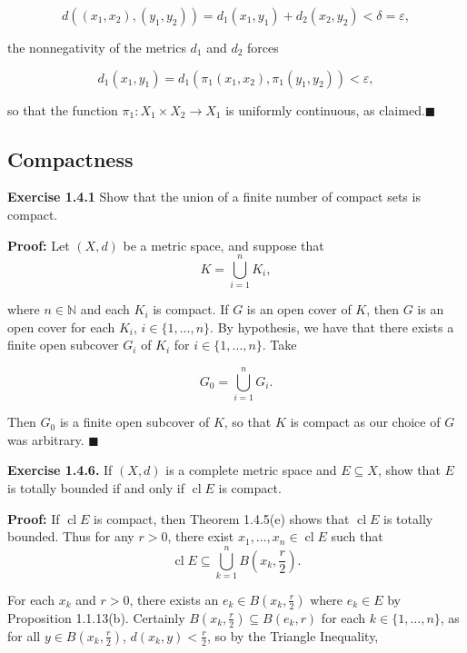 \documentclass{article}
\DeclareMathOperator{\cl}{cl}
\begin{document}
\begin{equation*}
    d((x_1,x_2),(y_1,y_2))=d_1(x_1,y_1)+d_2(x_2,y_2)<\delta =\varepsilon,
\end{equation*}

the nonnegativity of the metrics $d_1$ and $d_2$ forces

\begin{equation*}
    d_1(x_1,y_1)=d_1\left(\pi_1(x_1,x_2),\pi_1(y_1,y_2)\right)<\varepsilon,
\end{equation*}

so that the function $\pi_1 :X_1 \times X_2\to X_1$ is uniformly continuous, as claimed.$\blacksquare$
\newpage
\subsection{ Compactness}
\begin{tcolorbox}
\textbf{Exercise 1.4.1} Show that the union of a finite number of compact sets is compact.
\end{tcolorbox}
\textbf{Proof:} Let $(X,d)$ be a metric space, and suppose that 
\begin{equation*}
    K=\bigcup_{i=1}^n K_i,
\end{equation*}

where $n\in \mathbb{N}$ and each $K_i$ is compact. If $G$ is an open cover of $K$, then $G$ is an open cover for each $K_i$, $i\in \{1,\dots,n\}$. By hypothesis, we have that there exists a finite open subcover $G_i$ of $K_i$ for $i\in \{1,\dots,n\}$. Take

\begin{equation*}
    G_0=\bigcup_{i=1}^n G_i.
\end{equation*}

Then $G_0$ is a finite open subcover of $K$, so that $K$ is compact as our choice of $G$ was arbitrary. $\blacksquare$
\begin{tcolorbox}
\textbf{Exercise 1.4.6.} If $(X,d)$ is a complete metric space and $E\subseteq X$, show that $E$ is totally bounded if and only if $\cl E$ is compact.
\end{tcolorbox}
\textbf{Proof:} If $\cl E$ is compact, then Theorem 1.4.5(e) shows that $\cl E$ is totally bounded. Thus for any $r>0$, there exist $x_1,\dots ,x_n\in \cl E$ such that 
\begin{equation*}
    \cl E\subseteq \bigcup_{k=1}^n B\left(x_k,\frac{r}{2}\right).
\end{equation*}

For each $x_k$ and $r>0$, there exists an $e_k\in B\left(x_k,\frac{r}{2}\right)$ where $e_k\in E$ by Proposition 1.1.13(b). Certainly $B\left(x_k,\frac{r}{2}\right)\subseteq B(e_k,r)$ for each $k\in \{1,\dots,n\}$, as for all $y\in B\left(x_k,\frac{r}{2}\right)$, $d(x_k,y)<\frac{r}{2}$, so by the Triangle Inequality,
\end{document}
